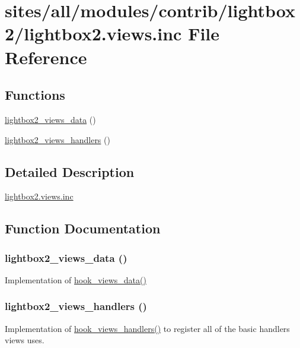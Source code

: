 \hypertarget{lightbox2_8views_8inc}{
\section{sites/all/modules/contrib/lightbox2/lightbox2.views.inc File Reference}
\label{lightbox2_8views_8inc}
}
\subsection*{Functions}
\begin{CompactItemize}
\item 
\hyperlink{lightbox2_8views_8inc_51098a1a6bf9177624f18f0f45c27ecc}{lightbox2\_\-views\_\-data} ()
\item 
\hyperlink{lightbox2_8views_8inc_02df7fb832b8aa549623c86774d9cce0}{lightbox2\_\-views\_\-handlers} ()
\end{CompactItemize}


\subsection{Detailed Description}
\hyperlink{lightbox2_8views_8inc}{lightbox2.views.inc} 

\subsection{Function Documentation}
\hypertarget{lightbox2_8views_8inc_51098a1a6bf9177624f18f0f45c27ecc}{
\subsubsection[{lightbox2\_\-views\_\-data}]{\setlength{\rightskip}{0pt plus 5cm}lightbox2\_\-views\_\-data ()}}
\label{lightbox2_8views_8inc_51098a1a6bf9177624f18f0f45c27ecc}


Implementation of \hyperlink{group__views__hooks_g227057901681e4a33e33c199c7a8c989}{hook\_\-views\_\-data()} \hypertarget{lightbox2_8views_8inc_02df7fb832b8aa549623c86774d9cce0}{
\subsubsection[{lightbox2\_\-views\_\-handlers}]{\setlength{\rightskip}{0pt plus 5cm}lightbox2\_\-views\_\-handlers ()}}
\label{lightbox2_8views_8inc_02df7fb832b8aa549623c86774d9cce0}


Implementation of \hyperlink{group__views__hooks_gbf506f44bd8d8a86876f27396f5341ed}{hook\_\-views\_\-handlers()} to register all of the basic handlers views uses. 